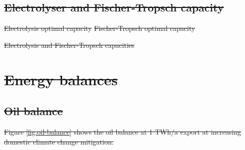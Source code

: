 \documentclass[5p,numafflabel]{elsarticle}
\providecommand{\DIFdeltex}[1]{{\protect\color{red}\sout{#1}}}                      %
\providecommand{\DIFdelFL}[1]{\DIFdel{#1}} %
\providecommand{\DIFdel}[1]{\texorpdfstring{\DIFdeltex{#1}}{}} %
\begin{document}
\subsection{\DIFdel{Electrolyser and Fischer-Tropsch capacity}}
\addtocounter{subsection}{-1}%

{%
\DIFdelFL{Electrolysis optimal capacity}}
{%
\DIFdelFL{Fischer-Tropsch optimal capacity}}


{%
\DIFdelFL{Electrolysis and Fischer-Tropsch capacities}}

\section{\DIFdel{Energy balances}}
\addtocounter{section}{-1}%

\subsection{\DIFdel{Oil balance}}
\addtocounter{subsection}{-1}%
\DIFdel{Figure \ref{fig:oil-balance} shows the oil balance at 1 TWh/a export at increasing domestic climate change mitigation.
}%
\end{document}
